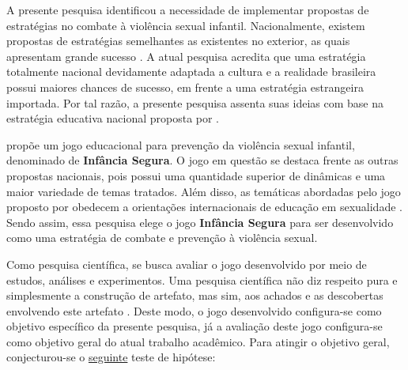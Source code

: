 A presente pesquisa identificou a necessidade de implementar propostas de estratégias no combate à violência sexual infantil. Nacionalmente, existem propostas de estratégias semelhantes as existentes no exterior, as quais apresentam grande sucesso \cite{steiler2012orbit, jones2020serious}. A atual pesquisa acredita que uma estratégia totalmente nacional devidamente adaptada a cultura e a realidade brasileira possui maiores chances de sucesso, em frente a uma estratégia estrangeira importada. Por tal razão, a presente pesquisa assenta suas ideias com base na estratégia educativa nacional proposta por .

 propõe um jogo educacional para prevenção da violência sexual infantil, denominado de \textbf{Infância Segura}. O jogo em questão se destaca frente as outras propostas nacionais, pois possui uma quantidade superior de dinâmicas e uma maior variedade de temas tratados. Além disso, as temáticas abordadas pelo jogo proposto por  obedecem a orientações internacionais de educação em sexualidade \cite{unesco2018international}. Sendo assim, essa pesquisa elege o jogo \textbf{Infância Segura} para ser desenvolvido como uma estratégia de combate e prevenção à violência sexual.

Como pesquisa científica, se busca avaliar o jogo desenvolvido por meio de estudos, análises e experimentos. Uma pesquisa científica não diz respeito pura e simplesmente a construção de artefato, mas sim, aos achados e as descobertas envolvendo este artefato \cite{wazlawick2014metodologia}. Deste modo, o jogo desenvolvido configura-se como objetivo específico da presente pesquisa, já a avaliação deste jogo configura-se como objetivo geral do atual trabalho acadêmico. Para atingir o objetivo geral, conjecturou-se o \hyperref[hipotese]{seguinte} teste de hipótese:

